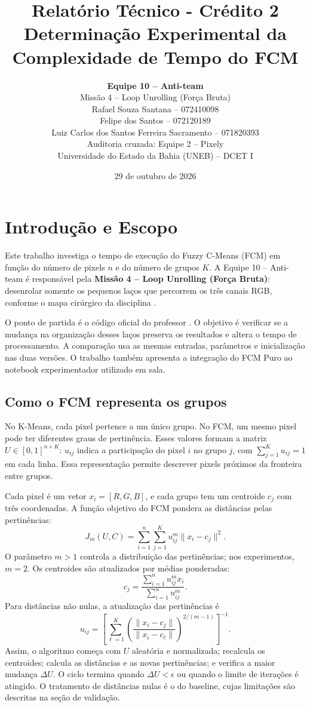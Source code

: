 \documentclass[11pt,a4paper]{article}
\title{\textbf{Relatório Técnico - Crédito 2}\\
\Large{Determinação Experimental da Complexidade de Tempo do FCM}}
\author{\textbf{Equipe 10 -- Anti-team}\\
Missão 4 -- Loop Unrolling (Força Bruta)\\
\small Rafael Souza Santana -- 072410098\\
\small Felipe dos Santos -- 072120189\\
\small Luiz Carlos dos Santos Ferreira Sacramento -- 071820393\\
\small Auditoria cruzada: Equipe 2 -- Pixely\\
\small Universidade do Estado da Bahia (UNEB) -- DCET I}
\date{29 de outubro de 2026}
\begin{document}
\maketitle

\section{Introdução e Escopo}
Este trabalho investiga o tempo de execução do Fuzzy C-Means (FCM) em função
do número de pixels $n$ e do número de grupos $K$. A Equipe 10 -- Anti-team
é responsável pela \textbf{Missão 4 -- Loop Unrolling (Força Bruta)}:
desenrolar somente os pequenos laços que percorrem os três canais RGB,
conforme o mapa cirúrgico da disciplina \cite{missao,template}.

O ponto de partida é o código oficial do professor \cite{base}. O objetivo
é verificar se a mudança na organização desses laços preserva os resultados
e altera o tempo de processamento. A comparação usa as mesmas entradas,
parâmetros e inicialização nas duas versões. O trabalho também apresenta a
integração do FCM Puro ao notebook experimentador utilizado em sala.

\subsection{Como o FCM representa os grupos}
No K-Means, cada pixel pertence a um único grupo. No FCM, um mesmo pixel pode
ter diferentes graus de pertinência. Esses valores formam a matriz
$U\in[0,1]^{n\times K}$: $u_{ij}$ indica a participação do pixel $i$ no grupo
$j$, com $\sum_{j=1}^{K}u_{ij}=1$ em cada linha.
Essa representação permite descrever pixels próximos da fronteira entre grupos.

Cada pixel é um vetor $x_i=[R,G,B]$, e cada grupo tem um centroide $c_j$ com
três coordenadas. A função objetivo do FCM pondera as distâncias pelas
pertinências:
\begin{equation}
 J_m(U,C)=\sum_{i=1}^{n}\sum_{j=1}^{K}u_{ij}^{m}\lVert x_i-c_j\rVert^2.
\end{equation}
O parâmetro $m>1$ controla a distribuição das pertinências; nos experimentos,
$m=2$. Os centroides são atualizados por médias ponderadas:
\begin{equation}
 c_j=\frac{\sum_{i=1}^{n}u_{ij}^{m}x_i}{\sum_{i=1}^{n}u_{ij}^{m}}.
\end{equation}
Para distâncias não nulas, a atualização das pertinências é
\begin{equation}
 u_{ij}=\left[\sum_{\ell=1}^{K}
 \left(\frac{\lVert x_i-c_j\rVert}{\lVert x_i-c_{\ell}\rVert}\right)^{2/(m-1)}
 \right]^{-1}.
\end{equation}
Assim, o algoritmo começa com $U$ aleatória e normalizada; recalcula os
centroides; calcula as distâncias e as novas pertinências; e verifica a maior
mudança $\Delta U$. O ciclo termina quando $\Delta U<\epsilon$ ou quando o
limite de iterações é atingido. O tratamento de distâncias nulas é o do
baseline, cujas limitações são descritas na seção de validação.
\end{document}
